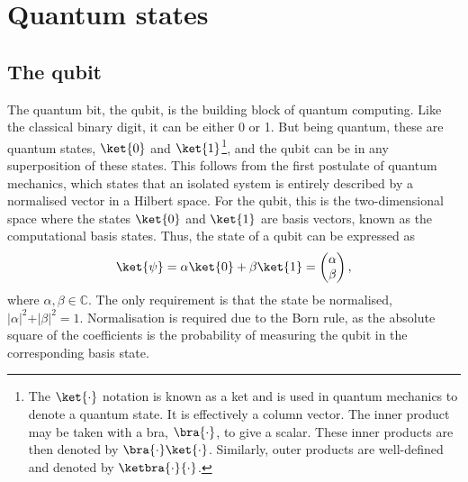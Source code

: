 \section{Quantum states}
\label{sec:qstates}
\subsection{The qubit}
The quantum bit, the qubit, is the building block of quantum computing.
Like the classical binary digit, it can be either 0 or 1.
But being quantum, these are quantum states, $\ket{0}$ and $\ket{1}$\footnote{%
  The $\ket{\cdot}$ notation is known as a ket and is used in quantum mechanics to denote a quantum state.
  It is effectively a column vector.
  The inner product may be taken with a bra, $\bra{\cdot}$, to give a scalar.
  These inner products are then denoted by $\bra{\cdot}\ket{\cdot}$.
  Similarly, outer products are well-defined and denoted by $\ketbra{\cdot}{\cdot}$.%
}, and the qubit can be in any superposition of these states.
This follows from the first postulate of quantum mechanics\footnotemark, which states that an isolated system is entirely described by a normalised vector in a Hilbert space.
%
For the qubit, this is the two-dimensional space where the states $\ket{0}$ and $\ket{1}$ are basis vectors, known as the computational basis states.
Thus, the state of a qubit can be expressed as
\begin{equation}
  \ket{\psi} = \alpha \ket{0} + \beta \ket{1} = \begin{pmatrix} \alpha \\ \beta \end{pmatrix},
  \label{eq:qubit}
\end{equation}
where $\alpha, \beta \in \mathbb{C}$.
The only requirement is that the state be normalised, $\vert\alpha\vert^2 + \vert\beta\vert^2 = 1$.
Normalisation is required due to the Born rule, as the absolute square of the coefficients is the probability of measuring the qubit in the corresponding basis state.

